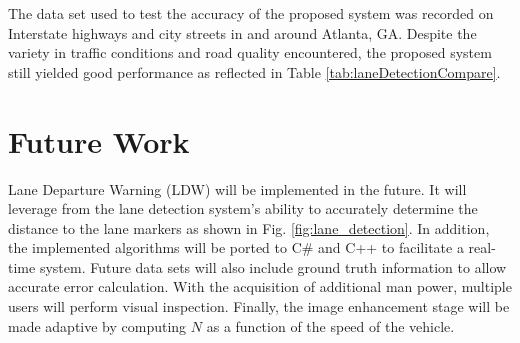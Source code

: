 \documentclass{article}
\begin{document}
The data set used to test the accuracy of the proposed system was recorded on Interstate highways and city streets in and around Atlanta, GA. Despite the variety in traffic conditions and road quality encountered, the proposed system still yielded good performance as reflected in Table \ref{tab:laneDetectionCompare}.

\section{Future Work}
\label{sec:print}
Lane Departure Warning (LDW) will be implemented in the future. It will leverage from the lane detection system's ability to accurately determine the distance to the lane markers as shown in Fig. \ref{fig:lane_detection}. In addition, the implemented algorithms will be ported to C\# and C++ to facilitate a real-time system. Future data sets will also include ground truth information to allow accurate error calculation. With the acquisition of additional man power, multiple users will perform visual inspection. Finally, the image enhancement stage will be made adaptive by computing $N$ as a function of the speed of the vehicle.

\small


\end{document}
